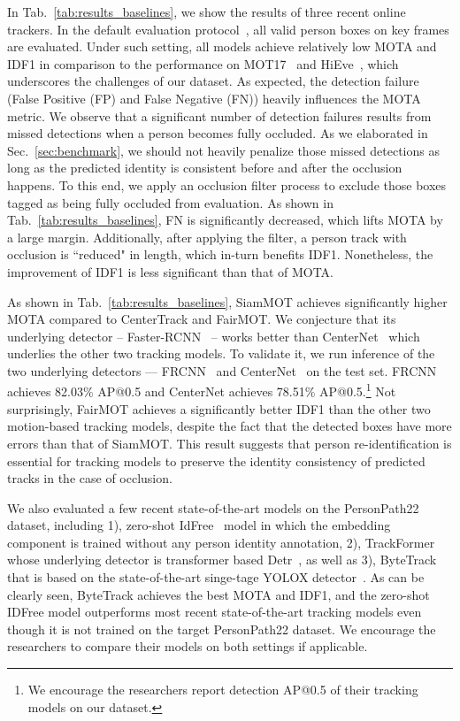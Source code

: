 \documentclass[runningheads]{llncs}
\begin{document}
In Tab.~\ref{tab:results_baselines}, we show the results of three recent online trackers. In the default evaluation protocol~\cite{mot,mot20,hieve}, all valid person boxes on key frames are evaluated. Under such setting, all models achieve relatively low MOTA and IDF1 in comparison to the performance on MOT17~\cite{mot} and HiEve~\cite{hieve}, which underscores the challenges of our dataset. As expected, the detection failure (False Positive (FP) and False Negative (FN)) heavily influences the MOTA metric. We observe that a significant number of detection failures results from missed detections when a person becomes fully occluded. As we elaborated in Sec.~\ref{sec:benchmark}, we should not heavily penalize those missed detections as long as the predicted identity is consistent before and after the occlusion happens. To this end, we apply an occlusion filter process to exclude those boxes tagged as being fully occluded from evaluation. As shown in Tab.~\ref{tab:results_baselines}, FN is significantly decreased, which lifts MOTA by a large margin.  
Additionally, after applying the filter, a person track with occlusion is ``reduced" in length, which in-turn benefits IDF1. Nonetheless, the improvement of IDF1 is less significant than that of MOTA.

As shown in Tab.~\ref{tab:results_baselines}, SiamMOT achieves significantly higher MOTA compared to CenterTrack and FairMOT. We conjecture that its underlying detector -- Faster-RCNN~\cite{fasterrcnn} -- works better than CenterNet~\cite{centernet} which underlies the other two tracking models. To validate it, we run inference of the two underlying detectors — FRCNN~\cite{fasterrcnn} and CenterNet~\cite{centernet} on the test set. FRCNN achieves 82.03\%
AP@0.5 and CenterNet achieves 78.51\% AP@0.5.\footnote{We encourage the researchers report detection AP@0.5 of their tracking models on our dataset.} Not surprisingly, FairMOT achieves a significantly better IDF1 than the other two motion-based tracking models, despite the fact that the detected boxes have more errors than that of SiamMOT. This result suggests that person re-identification is essential for tracking models to preserve the identity consistency of predicted tracks in the case of occlusion.

We also evaluated a few recent state-of-the-art models on the PersonPath22 dataset, including 1), zero-shot IdFree~\cite{pointid} model in which the embedding component is trained without any person identity annotation, 2), TrackFormer~\cite{trackformer} whose underlying detector is transformer based Detr~\cite{detr}, as well as 3), ByteTrack~\cite{bytetrack} that is based on the state-of-the-art singe-tage YOLOX detector~\cite{yolox}. As can be clearly seen, ByteTrack achieves the best MOTA and IDF1, and the zero-shot IDFree model outperforms most recent state-of-the-art tracking models even though it is not trained on the target PersonPath22 dataset. We encourage the researchers to compare their models on both settings if applicable.
\end{document}
